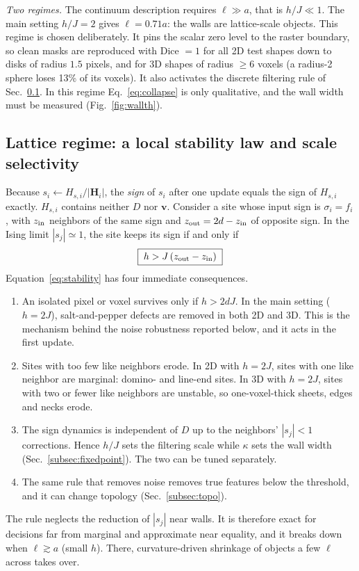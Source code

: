 \documentclass[11pt,a4paper]{article}
\newcommand{\vv}{\bm v}
\begin{document}
\emph{Two regimes.} The continuum description requires $\ell\gg a$, that is $h/J\ll1$. The main setting $h/J=2$ gives $\ell=0.71a$: the walls are lattice-scale objects. This regime is chosen deliberately. It pins the scalar zero level to the raster boundary, so clean masks are reproduced with Dice $=1$ for all 2D test shapes down to disks of radius $1.5$ pixels, and for 3D shapes of radius $\ge6$ voxels (a radius-2 sphere loses 13\% of its voxels). It also activates the discrete filtering rule of Sec.~\ref{subsec:stability}. In this regime Eq.~\eqref{eq:collapse} is only qualitative, and the wall width must be measured (Fig.~\ref{fig:wallth}).

\subsection{Lattice regime: a local stability law and scale selectivity}\label{subsec:stability}
Because $s_i\leftarrow H_{s,i}/|\bm H_i|$, the \emph{sign} of $s_i$ after one update equals the sign of $H_{s,i}$ exactly. $H_{s,i}$ contains neither $D$ nor $\vv$. Consider a site whose input sign is $\sigma_i=f_i$, with $z_{\rm in}$ neighbors of the same sign and $z_{\rm out}=2d-z_{\rm in}$ of opposite sign. In the Ising limit $|s_j|\simeq1$, the site keeps its sign if and only if
\begin{equation}
 \boxed{\;h>J\,(z_{\rm out}-z_{\rm in})\;}
 \label{eq:stability}
\end{equation}
Equation~\eqref{eq:stability} has four immediate consequences.
\begin{enumerate}[label=(\roman*),leftmargin=2em,itemsep=0.1em]
\item An isolated pixel or voxel survives only if $h>2dJ$. In the main setting ($h=2J$), salt-and-pepper defects are removed in both 2D and 3D. This is the mechanism behind the noise robustness reported below, and it acts in the first update.
\item Sites with too few like neighbors erode. In 2D with $h=2J$, sites with one like neighbor are marginal: domino- and line-end sites. In 3D with $h=2J$, sites with two or fewer like neighbors are unstable, so one-voxel-thick sheets, edges and necks erode.
\item The sign dynamics is independent of $D$ up to the neighbors' $|s_j|<1$ corrections. Hence $h/J$ sets the filtering scale while $\kappa$ sets the wall width (Sec.~\ref{subsec:fixedpoint}). The two can be tuned separately.
\item The same rule that removes noise removes true features below the threshold, and it can change topology (Sec.~\ref{subsec:topo}).
\end{enumerate}
The rule neglects the reduction of $|s_j|$ near walls. It is therefore exact for decisions far from marginal and approximate near equality, and it breaks down when $\ell\gtrsim a$ (small $h$). There, curvature-driven shrinkage of objects a few $\ell$ across takes over.
\end{document}
